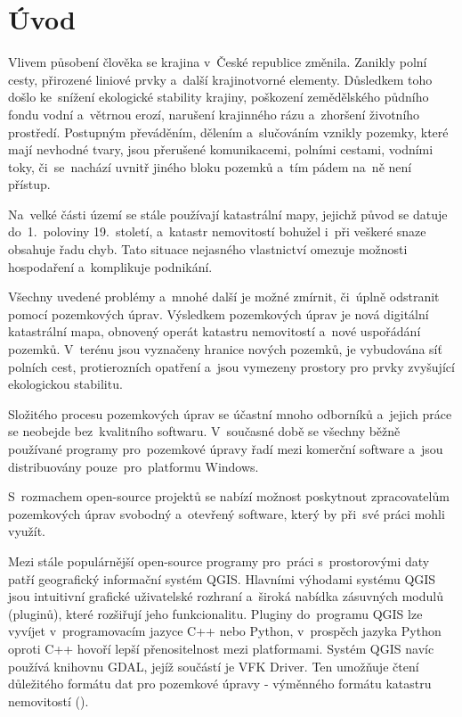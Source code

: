 \chapter{Úvod}
\label{1-uvod}

Vlivem působení člověka se krajina v~České republice změnila. Zanikly polní cesty, přirozené liniové prvky a~další krajinotvorné elementy. Důsledkem toho došlo ke~snížení ekologické stability krajiny, poškození zemědělského půdního fondu vodní a~větrnou erozí, narušení krajinného rázu a~zhoršení životního prostředí. Postupným převáděním, dělením a~slučováním vznikly pozemky, které mají nevhodné tvary, jsou přerušené komunikacemi, polními cestami, vodními toky, či~se~nachází uvnitř jiného bloku pozemků a~tím pádem na~ně není přístup.

Na~velké části území se stále používají katastrální mapy, jejichž původ se datuje do~1.~poloviny 19.~století, a~katastr nemovitostí bohužel i~při veškeré snaze obsahuje řadu chyb. Tato situace nejasného vlastnictví omezuje možnosti hospodaření a~komplikuje podnikání.

Všechny uvedené problémy a~mnohé další je možné zmírnit, či~úplně odstranit pomocí pozemkových úprav. Výsledkem pozemkových úprav je nová digitální katastrální mapa, obnovený operát katastru nemovitostí a~nové uspořádání pozemků. V~terénu jsou vyznačeny hranice nových pozemků, je vybudována síť polních cest, protierozních opatření a~jsou vymezeny prostory pro prvky zvyšující ekologickou stabilitu.

Složitého procesu pozemkových úprav se účastní mnoho odborníků a~jejich práce se neobejde bez~kvalitního softwaru. V~současné době se všechny běžně používané programy pro~pozemkové úpravy řadí mezi komerční software a~jsou distribuovány pouze~pro~platformu Windows.

S~rozmachem open-source projektů se nabízí možnost poskytnout zpracovatelům pozemkových úprav svobodný a~otevřený software, který by při~své práci mohli využít.

Mezi stále populárnější open-source programy pro~práci s~prostorovými daty patří geografický informační systém QGIS. Hlavními výhodami systému QGIS jsou intuitivní grafické uživatelské rozhraní a~široká nabídka zásuvných modulů (pluginů), které rozšiřují jeho funkcionalitu. Pluginy do~programu QGIS lze vyvíjet v~programovacím jazyce C++ nebo Python, v~prospěch jazyka Python oproti C++ hovoří lepší přenositelnost mezi platformami. Systém QGIS navíc používá knihovnu GDAL, jejíž součástí je VFK Driver. Ten umožňuje čtení důležitého formátu dat pro pozemkové úpravy - výměnného formátu katastru nemovitostí ().

